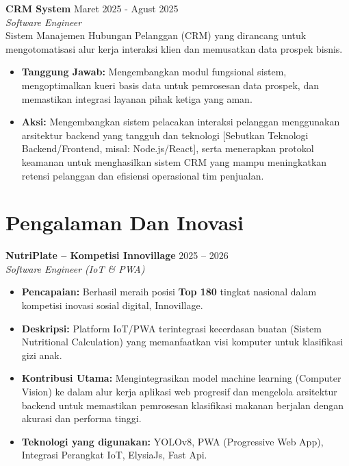 \documentclass[11pt,a4paper]{article}
\begin{document}
\textbf{CRM System} \hfill Maret 2025 - Agust 2025 \\
\textit{Software Engineer} \\
Sistem Manajemen Hubungan Pelanggan (CRM) yang dirancang untuk mengotomatisasi alur kerja interaksi klien dan memusatkan data prospek bisnis.
\begin{itemize}[leftmargin=0.25in]
    \item \textbf{Tanggung Jawab:} Mengembangkan modul fungsional sistem, mengoptimalkan kueri basis data untuk pemrosesan data prospek, dan memastikan integrasi layanan pihak ketiga yang aman.
    \item \textbf{Aksi:} Mengembangkan sistem pelacakan interaksi pelanggan menggunakan arsitektur backend yang tangguh dan teknologi [Sebutkan Teknologi Backend/Frontend, misal: Node.js/React], serta menerapkan protokol keamanan untuk menghasilkan sistem CRM yang mampu meningkatkan retensi pelanggan dan efisiensi operasional tim penjualan.
\end{itemize}


\section*{Pengalaman Dan Inovasi}

\textbf{NutriPlate -- Kompetisi Innovillage} \hfill 2025 -- 2026 \\
\textit{Software Engineer (IoT \& PWA)}
\begin{itemize}[leftmargin=0.25in]
    \item \textbf{Pencapaian:} Berhasil meraih posisi \textbf{Top 180} tingkat nasional dalam kompetisi inovasi sosial digital, Innovillage.
    \item \textbf{Deskripsi:} Platform IoT/PWA terintegrasi kecerdasan buatan (Sistem Nutritional Calculation) yang memanfaatkan visi komputer untuk klasifikasi gizi anak.
    \item \textbf{Kontribusi Utama:} Mengintegrasikan model machine learning (Computer Vision) ke dalam alur kerja aplikasi web progresif dan mengelola arsitektur backend untuk memastikan pemrosesan klasifikasi makanan berjalan dengan akurasi dan performa tinggi.
    \item \textbf{Teknologi yang digunakan:} YOLOv8, PWA (Progressive Web App), Integrasi Perangkat IoT, ElysiaJs, Fast Api.
\end{itemize}

\end{document}
